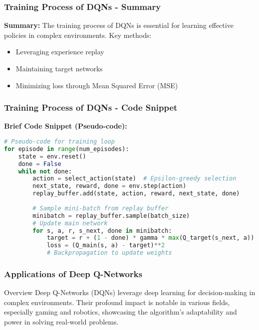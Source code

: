 \documentclass[aspectratio=169]{beamer}
\begin{document}
\begin{frame}[fragile]
    \frametitle{Training Process of DQNs - Summary}
    \textbf{Summary:}
    The training process of DQNs is essential for learning effective policies in complex environments. 
    Key methods:
    \begin{itemize}
        \item Leveraging experience replay
        \item Maintaining target networks
        \item Minimizing loss through Mean Squared Error (MSE)
    \end{itemize}
\end{frame}

\begin{frame}[fragile]
    \frametitle{Training Process of DQNs - Code Snippet}
    \textbf{Brief Code Snippet (Pseudo-code):}
    \begin{lstlisting}[language=Python]
# Pseudo-code for training loop
for episode in range(num_episodes):
    state = env.reset()
    done = False
    while not done:
        action = select_action(state)  # Epsilon-greedy selection
        next_state, reward, done = env.step(action)
        replay_buffer.add(state, action, reward, next_state, done)
        
        # Sample mini-batch from replay buffer
        minibatch = replay_buffer.sample(batch_size)
        # Update main network
        for s, a, r, s_next, done in minibatch:
            target = r + (1 - done) * gamma * max(Q_target(s_next, a))
            loss = (Q_main(s, a) - target)**2
            # Backpropagation to update weights
    \end{lstlisting}
\end{frame}

\begin{frame}[fragile]
    \frametitle{Applications of Deep Q-Networks}
    \begin{block}{Overview}
        Deep Q-Networks (DQNs) leverage deep learning for decision-making in complex environments. Their profound impact is notable in various fields, especially gaming and robotics, showcasing the algorithm's adaptability and power in solving real-world problems.
    \end{block}
\end{frame}
\end{document}
